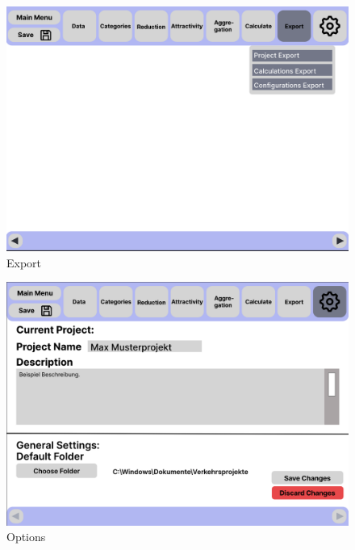 \documentclass[parskip=full]{scrartcl} %
\begin{document}
\begin{figure}
    \centering
    \includegraphics[width=1\textwidth]{pictures/Export.png}
    \caption{Export}
\end{figure}

\begin{figure}
    \centering
    \includegraphics[width=1\textwidth]{pictures/Options.png}
    \caption{Options}
\end{figure}

\newpage
\end{document}
